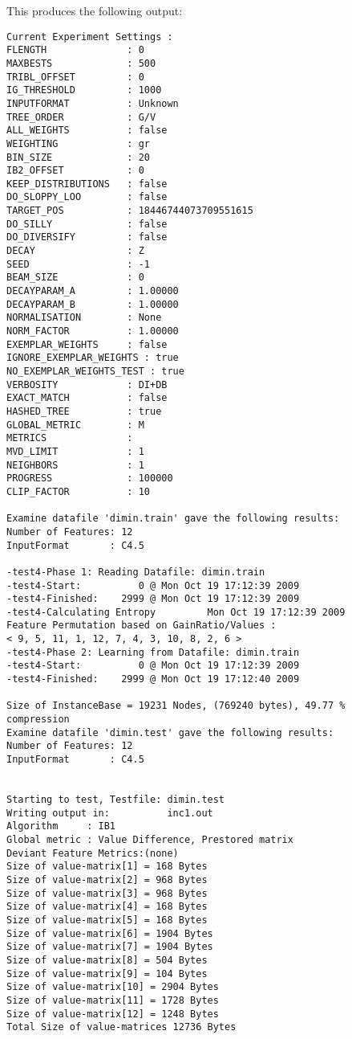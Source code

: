 \documentclass{report}
\begin{document}
This produces the following output:

\begin{footnotesize}
\begin{verbatim}
Current Experiment Settings :
FLENGTH              : 0
MAXBESTS             : 500
TRIBL_OFFSET         : 0
IG_THRESHOLD         : 1000
INPUTFORMAT          : Unknown
TREE_ORDER           : G/V
ALL_WEIGHTS          : false
WEIGHTING            : gr
BIN_SIZE             : 20
IB2_OFFSET           : 0
KEEP_DISTRIBUTIONS   : false
DO_SLOPPY_LOO        : false
TARGET_POS           : 18446744073709551615
DO_SILLY             : false
DO_DIVERSIFY         : false
DECAY                : Z
SEED                 : -1
BEAM_SIZE            : 0
DECAYPARAM_A         : 1.00000
DECAYPARAM_B         : 1.00000
NORMALISATION        : None
NORM_FACTOR          : 1.00000
EXEMPLAR_WEIGHTS     : false
IGNORE_EXEMPLAR_WEIGHTS : true
NO_EXEMPLAR_WEIGHTS_TEST : true
VERBOSITY            : DI+DB
EXACT_MATCH          : false
HASHED_TREE          : true
GLOBAL_METRIC        : M
METRICS              : 
MVD_LIMIT            : 1
NEIGHBORS            : 1
PROGRESS             : 100000
CLIP_FACTOR          : 10

Examine datafile 'dimin.train' gave the following results:
Number of Features: 12
InputFormat       : C4.5

-test4-Phase 1: Reading Datafile: dimin.train
-test4-Start:          0 @ Mon Oct 19 17:12:39 2009
-test4-Finished:    2999 @ Mon Oct 19 17:12:39 2009
-test4-Calculating Entropy         Mon Oct 19 17:12:39 2009
Feature Permutation based on GainRatio/Values :
< 9, 5, 11, 1, 12, 7, 4, 3, 10, 8, 2, 6 >
-test4-Phase 2: Learning from Datafile: dimin.train
-test4-Start:          0 @ Mon Oct 19 17:12:39 2009
-test4-Finished:    2999 @ Mon Oct 19 17:12:40 2009

Size of InstanceBase = 19231 Nodes, (769240 bytes), 49.77 % compression
Examine datafile 'dimin.test' gave the following results:
Number of Features: 12
InputFormat       : C4.5


Starting to test, Testfile: dimin.test
Writing output in:          inc1.out
Algorithm     : IB1
Global metric : Value Difference, Prestored matrix
Deviant Feature Metrics:(none)
Size of value-matrix[1] = 168 Bytes 
Size of value-matrix[2] = 968 Bytes 
Size of value-matrix[3] = 968 Bytes 
Size of value-matrix[4] = 168 Bytes 
Size of value-matrix[5] = 168 Bytes 
Size of value-matrix[6] = 1904 Bytes 
Size of value-matrix[7] = 1904 Bytes 
Size of value-matrix[8] = 504 Bytes 
Size of value-matrix[9] = 104 Bytes 
Size of value-matrix[10] = 2904 Bytes 
Size of value-matrix[11] = 1728 Bytes 
Size of value-matrix[12] = 1248 Bytes 
Total Size of value-matrices 12736 Bytes 


\end{verbatim}
\end{footnotesize}
\end{document}
